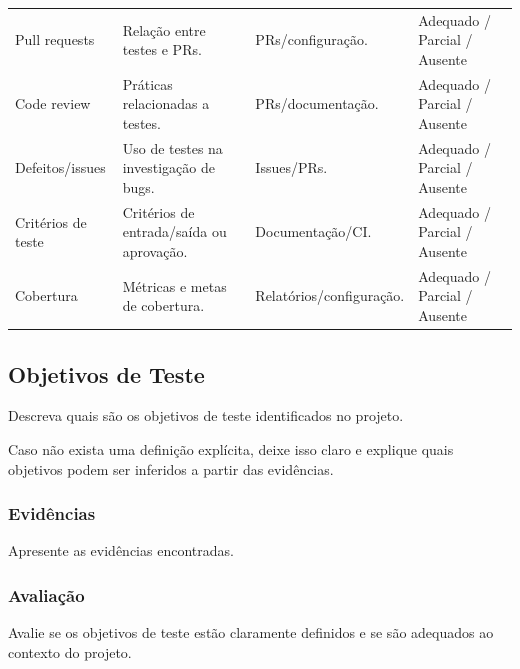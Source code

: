\begin{longtable}{p{3.0cm} p{4.2cm} p{4.2cm} p{2.5cm}}
Pull requests
&
Relação entre testes e PRs.
&
PRs/configuração.
&
Adequado / Parcial / Ausente
\\

Code review
&
Práticas relacionadas a testes.
&
PRs/documentação.
&
Adequado / Parcial / Ausente
\\

Defeitos/issues
&
Uso de testes na investigação de bugs.
&
Issues/PRs.
&
Adequado / Parcial / Ausente
\\

Critérios de teste
&
Critérios de entrada/saída ou aprovação.
&
Documentação/CI.
&
Adequado / Parcial / Ausente
\\

Cobertura
&
Métricas e metas de cobertura.
&
Relatórios/configuração.
&
Adequado / Parcial / Ausente
\\

\bottomrule
\end{longtable}



\subsection{Objetivos de Teste}

Descreva quais são os objetivos de teste identificados no projeto.

Caso não exista uma definição explícita, deixe isso claro e
explique quais objetivos podem ser inferidos a partir das evidências.

\subsubsection*{Evidências}

Apresente as evidências encontradas.

\subsubsection*{Avaliação}

Avalie se os objetivos de teste estão claramente definidos e
se são adequados ao contexto do projeto.



